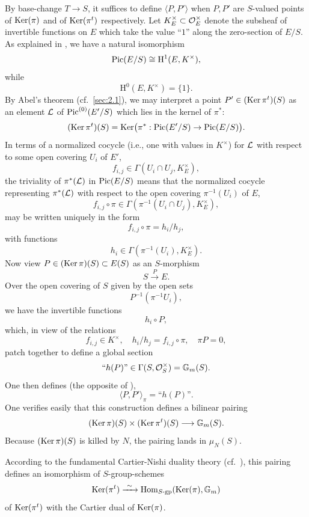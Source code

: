By base-change $T \to S$, it suffices to define $\langle P, P' \rangle$ when $P, P'$ are $S$-valued points of $\operatorname{Ker}(\pi)$ and of $\operatorname{Ker}(\pi^t)$ respectively. Let $K_E^\times \subset \mathcal{O}_E^\times$ denote the subsheaf of invertible functions on $E$ which take the value ``$1$'' along the zero-section of $E/S$. As explained in \cite[\S5, esp.~5.2, pp.~186--187]{K5}, we have a natural isomorphism
\setcounter{equation}{4}
\begin{equation}\label{eq:2.8.1.5}
\operatorname{Pic}(E/S) \cong \mathrm{H}^1(E, K^\times),
\end{equation}
while
\begin{equation}\label{eq:2.8.1.6}
\mathrm{H}^0(E, K^\times) = \{1\}.
\end{equation}
By Abel's theorem (cf.\ \ref{sec:2.1}), we may interpret a point $P' \in (\operatorname{Ker} \pi^t)(S)$ as an element $\mathcal{L}$ of $\operatorname{Pic}^{(0)}(E'/S)$ which lies in the kernel of $\pi^*$:
\begin{equation}\label{eq:2.8.1.7}
(\operatorname{Ker} \pi^t)(S) = \operatorname{Ker}\bigl(\pi^* : \operatorname{Pic}(E'/S) \to \operatorname{Pic}(E/S)\bigr).
\end{equation}
In terms of a normalized cocycle (i.e., one with values in $K^\times$) for $\mathcal{L}$ with respect to some open covering $U_i$ of $E'$,
\[
f_{i,j} \in \Gamma(U_i \cap U_j, K_E^\times),
\]
the triviality of $\pi^*(\mathcal{L})$ in $\operatorname{Pic}(E/S)$ means that the normalized cocycle representing $\pi^*(\mathcal{L})$ with respect to the open covering $\pi^{-1}(U_i)$ of $E$,
\[
f_{i,j} \circ \pi \in \Gamma(\pi^{-1}(U_i \cap U_j), K_E^\times),
\]
may be written uniquely in the form
\[
f_{i,j} \circ \pi = h_i/h_j,
\]
with functions
\[
h_i \in \Gamma(\pi^{-1}(U_i), K_E^\times).
\]
Now view $P \in (\operatorname{Ker} \pi)(S) \subset E(S)$ as an $S$-morphism
\[
S \xrightarrow{\ P\ } E.
\]
Over the open covering of $S$ given by the open sets
\[
P^{-1}(\pi^{-1}U_i),
\]
we have the invertible functions
\[
h_i \circ P,
\]
which, in view of the relations
\[
f_{i,j} \in K^\times, \quad h_i/h_j = f_{i,j} \circ \pi, \quad \pi P = 0,
\]
patch together to define a global section
\[
\text{``}h(P)\text{''} \in \Gamma(S, \mathcal{O}_S^\times) = \mathbb{G}_m(S).
\]
One then defines (the opposite of \cite[\S5]{K5}),
\[
\langle P, P' \rangle_\pi = \text{``}h(P)\text{''}.
\]
One verifies easily that this construction defines a bilinear pairing
\[
(\operatorname{Ker} \pi)(S) \times (\operatorname{Ker} \pi^t)(S) \longrightarrow \mathbb{G}_m(S).
\]
Because $(\operatorname{Ker} \pi)(S)$ is killed by $N$, the pairing lands in $\mu_N(S)$.

\kmitem\label{item:2.8.2}
According to the fundamental Cartier-Nishi duality theory (cf.~\cite{Oda}), this pairing defines an isomorphism of $S$-group-schemes
\begin{equation}\label{eq:2.8.2.1}
\operatorname{Ker}(\pi^t) \xrightarrow{\ \sim\ } \operatorname{Hom}_{S\text{-}\mathrm{gp}}(\operatorname{Ker}(\pi), \mathbb{G}_m)
\end{equation}
of $\operatorname{Ker}(\pi^t)$ with the Cartier dual of $\operatorname{Ker}(\pi)$.

